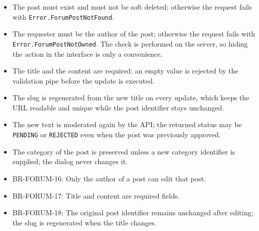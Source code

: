 \begin{itemize}[leftmargin=1.6em,topsep=3pt,itemsep=2pt,parsep=0pt,label=$\bullet$]
      \item The post must exist and must not be soft deleted; otherwise the request fails
            with \texttt{Error.ForumPostNotFound}.
      \item The requester must be the author of the post; otherwise the request fails with
            \texttt{Error.ForumPostNotOwned}. The check is performed on the server, so
            hiding the action in the interface is only a convenience.
      \item The title and the content are required; an empty value is rejected by the
            validation pipe before the update is executed.
      \item The slug is regenerated from the new title on every update, which keeps the URL
            readable and unique while the post identifier stays unchanged.
      \item The new text is moderated again by the API; the returned status may be
            \texttt{PENDING} or \texttt{REJECTED} even when the post was previously
            approved.
      \item The category of the post is preserved unless a new category identifier is
            supplied; the dialog never changes it.
\end{itemize}

\begin{itemize}[leftmargin=1.6em,topsep=3pt,itemsep=2pt,parsep=0pt,label=$\bullet$]\brrulelist
      \item BR-FORUM-16: Only the author of a post can edit that post.
      \item BR-FORUM-17: Title and content are required fields.
      \item BR-FORUM-18: The original post identifier remains unchanged after editing; the
            slug is regenerated when the title changes.
\end{itemize}

